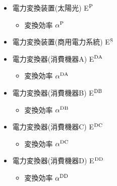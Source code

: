 \begin{itemize}
\begin{itemize}
			\item[\IB] 蓄電池の残量を離散化したときの分割数$B$
			\item[\IB] 蓄電池の残量の初期状態$b^{\rm F}_{0}$
		  	\item[\IC] 蓄電池の(期末の)残量 $b^{\rm F}_{k}$
  			\item[\IC] 蓄電池の残量の状態$s_{k-1}$で行動$a_{k}$を行なった際の蓄電池の充電量(変換前) $x^{\rm FC1}_{k}(s_{k-1},a_{k})$\\
			ただし，$x^{\rm FC1}_{k}(s_{k-1},s_{k}) < 0$を満たしているときは$|x^{\rm FC1}_{k}(s_{k-1},a_{k})|$だけ放電を行っていると解釈する．
  			\item[\IC] 蓄電池の残量の状態$s_{k-1}$で行動$a_{k}$を行なった際の蓄電池の充電量(変換後) $x^{\rm FC2}_{k}(s_{k-1},a_{k})$\\
			ただし，$x^{\rm FC2}_{k}(s_{k-1},a_{k}) < 0$を満たしているときは$|x^{\rm FC2}_{k}(s_{k-1},a_{k})|$だけ放電を行っていると解釈する．
			 \item[\IB] 単位時間あたりの最大充電電量 $a^{\rm FC}$
  			\item[\IB] 単位時間あたりの最大充放電量 $a^{\rm FD}$
  		\end{itemize}
 	\item[\IS] 電力変換装置(太陽光) E$^{\rm P}$
  		\begin{itemize}
   			\item[\IB] 変換効率 $\alpha^{\rm P}$
  		\end{itemize}
 	\item[\IS] 電力変換装置(商用電力系統) E$^{\rm S}$
 	\item[\IS] 電力変換器(消費機器A) E$^{\rm DA}$
  		\begin{itemize}
   			\item[\IB] 変換効率 $\alpha^{\rm DA}$
 		\end{itemize}
 	\item[\IS] 電力変換器(消費機器B) E$^{\rm DB}$
  		\begin{itemize}
  	 		\item[\IB] 変換効率 $\alpha^{\rm DB}$
 	 	\end{itemize}
 	\item[\IS] 電力変換器(消費機器C) E$^{\rm DC}$
	  	\begin{itemize}
	   		\item[\IB] 変換効率 $\alpha^{\rm DC}$
	 	 \end{itemize}
  	\item[\IS] 電力変換器(消費機器D) E$^{\rm DD}$
  	\begin{itemize}
   		\item[\IB] 変換効率 $\alpha^{\rm DD}$
  	\end{itemize} 
	

\end{itemize}
